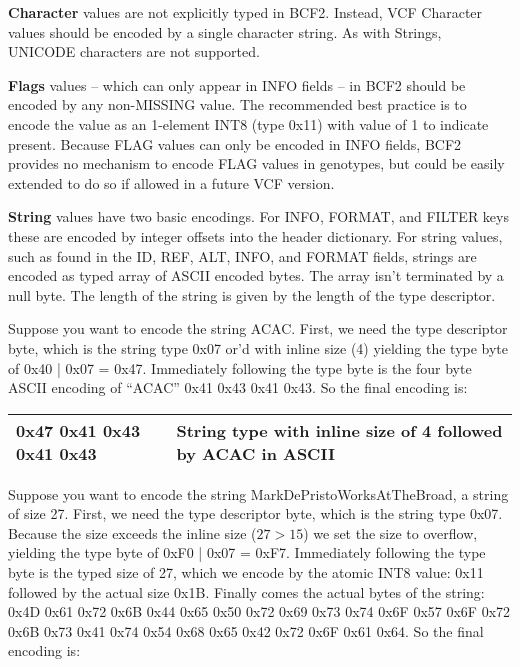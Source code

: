\documentclass[8pt]{article}
\begin{document}
\vspace{0.3cm}
\textbf{Character} values are not explicitly typed in BCF2.  Instead, VCF Character values should be encoded by a single character string.  As with Strings, UNICODE characters are not supported.

\vspace{0.3cm}
\textbf{Flags} values -- which can only appear in INFO fields -- in BCF2 should be encoded by any non-MISSING value.  The recommended best practice is to encode the value as an 1-element INT8 (type 0x11) with value of 1 to indicate present.  Because FLAG values can only be encoded in INFO fields, BCF2 provides no mechanism to encode FLAG values in genotypes, but could be easily extended to do so if allowed in a future VCF version.

\vspace{0.3cm}
\textbf{String} values have two basic encodings.  For INFO, FORMAT, and FILTER keys these are encoded by integer offsets into the header dictionary.  For string values, such as found in the ID, REF, ALT, INFO, and FORMAT fields, strings are encoded as typed array of ASCII encoded bytes.  The array isn't terminated by a null byte.  The length of the string is given by the length of the type descriptor.

Suppose you want to encode the string ACAC.  First, we need the type descriptor byte, which is the string type 0x07 or'd with inline size (4) yielding the type byte of 0x40 | 0x07 = 0x47.  Immediately following the type byte is the four byte ASCII encoding of ``ACAC'' 0x41 0x43 0x41 0x43.  So the final encoding is:

\vspace{0.1cm}
\begin{tabular}{| l | l |} \hline
0x47 0x41 0x43 0x41 0x43 & String type with inline size of 4 followed by ACAC in ASCII \\ \hline
\end{tabular}
\vspace{0.3cm}

Suppose you want to encode the string MarkDePristoWorksAtTheBroad, a string of size 27.  First, we need the type descriptor byte, which is the string type 0x07.  Because the size exceeds the inline size ($27 > 15$) we set the size to overflow, yielding the type byte of 0xF0 | 0x07 = 0xF7.  Immediately following the type byte is the typed size of 27, which we encode by the atomic INT8 value: 0x11 followed by the actual size 0x1B.  Finally comes the actual bytes of the string: 0x4D 0x61 0x72 0x6B 0x44 0x65 0x50 0x72 0x69 0x73 0x74 0x6F 0x57 0x6F 0x72 0x6B 0x73 0x41 0x74 0x54 0x68 0x65 0x42 0x72 0x6F 0x61 0x64.  So the final encoding is:
\end{document}
